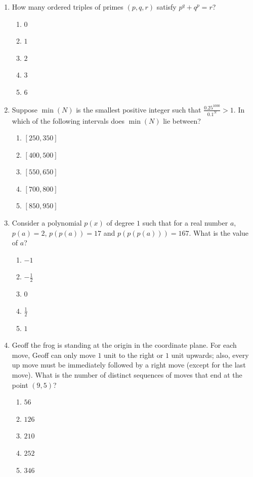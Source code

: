 \documentclass{article}
\begin{document}
\begin{enumerate}
\item How many ordered triples of primes $(p,q,r)$ satisfy $p^{q}+q^{p}=r$?
\begin{enumerate}
    \item $0$
    \item $1$
    \item $2$
    \item $3$
    \item $6$
\end{enumerate}

\item Suppose $\min(N)$ is the smallest positive integer such that $\frac{0.25^{1000}}{0.1^{N}}>1$. In which of the following intervals does $\min(N)$ lie between?
\begin{enumerate}
    \item $[250, 350]$
    \item $[400, 500]$
    \item $[550, 650]$
    \item $[700, 800]$
    \item $[850, 950]$
\end{enumerate}

\item Consider a polynomial $p(x)$ of degree $1$ such that for a real number $a$, $p(a)=2$, $p(p(a))=17$ and $p(p(p(a)))=167$. What is the value of $a$?
\begin{enumerate}
    \item $-1$
    \item $-\frac{1}{2}$
    \item $0$
    \item $\frac{1}{2}$
    \item $1$
\end{enumerate}

\item Geoff the frog is standing at the origin in the coordinate plane. For each move, Geoff can only move $1$ unit to the right or $1$ unit upwards; also, every up move must be immediately followed by a right move (except for the last move). What is the number of distinct sequences of moves that end at the point $(9,5)$?
\begin{enumerate}
    \item $56$
    \item $126$
    \item $210$
    \item $252$
    \item $346$
\end{enumerate}


\end{enumerate}
\end{document}
